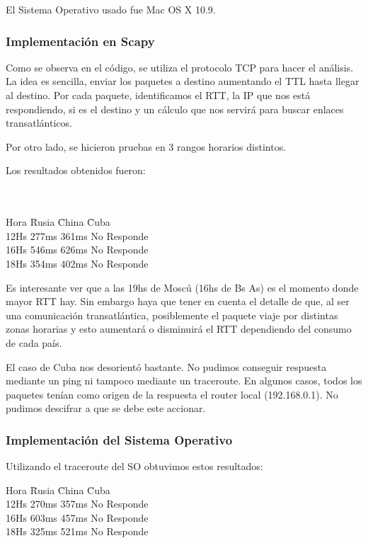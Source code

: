 \documentclass[%
	final,
	narroweqnarray,
	inline,
	twoside,
	]{ieee}
\begin{document}
El Sistema Operativo usado fue Mac OS X 10.9.
\subsubsection{Implementación en Scapy}
Como se observa en el código, se utiliza el protocolo TCP para hacer el análisis. La idea es sencilla, enviar los paquetes a destino aumentando el TTL hasta llegar al destino. Por cada paquete, identificamos el RTT, la IP que nos está respondiendo, si es el destino y un cálculo que nos servirá para buscar enlaces transatlánticos.

Por otro lado, se hicieron pruebas en 3 rangos horarios distintos.



Los resultados obtenidos fueron:
\begin{tabbing}
\\ \\

{Hora  }		\={Rusia  } 	\={China  }	\={Cuba  } \\
12Hs \>277ms \>361ms \>No Responde\\
16Hs \>546ms	\>626ms	\>No Responde\\
18Hs \>354ms	\>402ms	\>No Responde

\end{tabbing}

Es interesante ver que a las 19hs de Moscú (16hs de Bs As) es el momento donde mayor RTT hay. Sin embargo haya que tener en cuenta el detalle de que, al ser una comunicación transatlántica, posiblemente el paquete viaje por distintas zonas horarias y esto aumentará o disminuirá el RTT dependiendo del consumo de cada país.

El caso de Cuba nos desorientó bastante. No pudimos conseguir respuesta mediante un ping ni tampoco mediante un traceroute. En algunos casos, todos los paquetes tenían como origen de la respuesta el router local (192.168.0.1). No pudimos descifrar a que se debe este accionar.

\subsubsection{Implementación del Sistema Operativo}
Utilizando el traceroute del SO obtuvimos estos resultados: 
\begin{tabbing}
{Hora  }		\={Rusia  } 	\={China  }	\={Cuba  } \\
12Hs \>270ms \>357ms \>No Responde\\
16Hs \>603ms	\>457ms	\>No Responde\\
18Hs \>325ms	\>521ms	\>No Responde
\end{tabbing}
\end{document}
